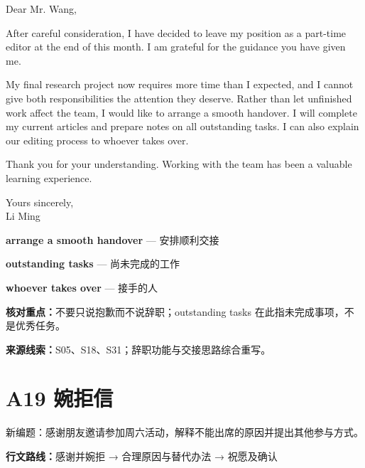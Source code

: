 \documentclass[11pt,a4paper,fontset=macnew]{ctexart}
\newenvironment{example}{\begingroup\fontsize{11}{14.3}\selectfont\setlength{\parskip}{4pt}}{\par\endgroup}
\begin{document}
\begin{example}
\noindent Dear Mr. Wang,\par
After careful consideration, I have decided to leave my position as a part-time editor at the end of this month. I am grateful for the guidance you have given me.

My final research project now requires more time than I expected, and I cannot give both responsibilities the attention they deserve. Rather than let unfinished work affect the team, I would like to arrange a smooth handover. I will complete my current articles and prepare notes on all outstanding tasks. I can also explain our editing process to whoever takes over.

Thank you for your understanding. Working with the team has been a valuable learning experience.

\noindent Yours sincerely,\\Li Ming\par
\end{example}
\par\vspace{4pt}{\bfseries 好词好句：优先记这三处}\par\nopagebreak
{\small\textbf{arrange a smooth handover} — 安排顺利交接}\par
{\small\textbf{outstanding tasks} — 尚未完成的工作}\par
{\small\textbf{whoever takes over} — 接手的人}\par
{\small\textbf{核对重点：}不要只说抱歉而不说辞职；outstanding tasks 在此指未完成事项，不是优秀任务。}\par
{\fontsize{8}{10}\selectfont\textbf{来源线索：}S05、S18、S31；辞职功能与交接思路综合重写。}\par
\clearpage\section*{A19  婉拒信}
{\small 新编题：感谢朋友邀请参加周六活动，解释不能出席的原因并提出其他参与方式。}\par
{\small\textbf{行文路线：}感谢并婉拒 → 合理原因与替代办法 → 祝愿及确认}\par
\par\vspace{4pt}{\bfseries 可替换模板}\par\nopagebreak
\end{document}

